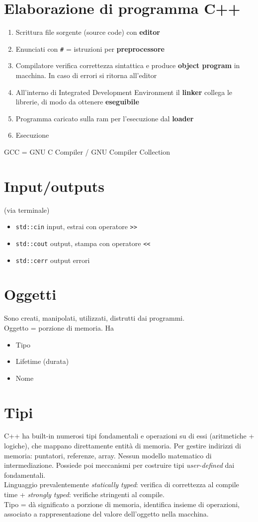 \documentclass[10pt, oneside]{book}
\begin{document}
\section{Elaborazione di programma C++}
\begin{enumerate}
\item Scrittura file sorgente (source code) con \textbf{editor}
\item Enunciati con \texttt{\#} = istruzioni per \textbf{preprocessore}
\item Compilatore verifica correttezza sintattica e produce \textbf{object program} in macchina. In caso di errori si ritorna all'editor
\item All'interno di Integrated Development Environment il \textbf{linker} collega le librerie, di modo da ottenere \textbf{eseguibile}
\item Programma caricato sulla ram per l'esecuzione dal \textbf{loader}
\item Esecuzione
\end{enumerate}
GCC = GNU C Compiler / GNU Compiler Collection

\section{Input/outputs}
(via terminale)
\begin{itemize}
\item \texttt{std::cin} input, estrai con operatore \texttt{>>}
\item \texttt{std::cout} output, stampa con operatore \texttt{<<}
\item \texttt{std::cerr} output errori
\end{itemize}

\section{Oggetti}
Sono creati, manipolati, utilizzati, distrutti dai programmi.\\
Oggetto = porzione di memoria. Ha
\begin{itemize}
\item Tipo
\item Lifetime (durata)
\item Nome
\end{itemize}

\section{Tipi}
C++ ha built-in numerosi tipi fondamentali e operazioni su di essi (aritmetiche + logiche), che mappano direttamente entità di memoria. Per gestire indirizzi di memoria: puntatori, referenze, array. Nessun modello matematico di intermediazione. Possiede poi meccanismi per costruire tipi \textit{user-defined} dai fondamentali.\\
Linguaggio prevalentemente \textit{statically typed}: verifica di correttezza al compile time + \textit{strongly typed}: verifiche stringenti al compile.\\
Tipo = dà significato a porzione di memoria, identifica insieme di operazioni, associato a rappresentazione del valore dell'oggetto nella macchina.
\end{document}
